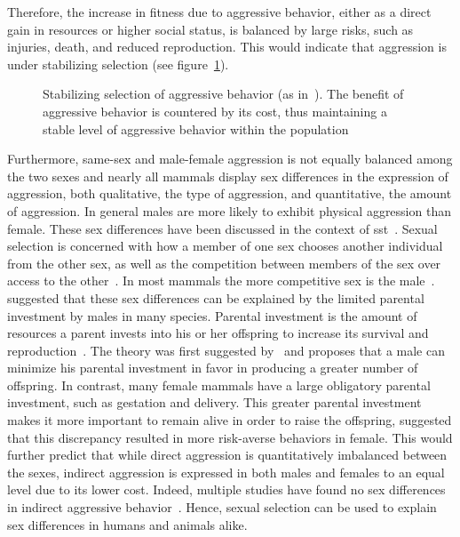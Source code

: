 Therefore, the increase in fitness due to aggressive behavior, either as a direct gain in resources or higher social status, is balanced by large risks, such as injuries, death, and reduced reproduction.
This would indicate that aggression is under stabilizing selection (see figure~\ref{fig:stab}).

\begin{figure}[hp]
	\centering
	\scalebox{0.6}{}
  \caption[Stabilizing Selection of Aggressive Behavior]{Stabilizing selection of aggressive behavior (as in~\citet{Anholt2012}).
  The benefit of aggressive behavior is countered by its cost, thus maintaining a stable level of aggressive behavior within the population}\label{fig:stab}
\end{figure}

Furthermore, same-sex and male-female aggression is not equally balanced among the two sexes and nearly all mammals display sex differences in the expression of aggression, both
qualitative, the type of aggression, and quantitative, the amount of aggression.
In general males are more likely to exhibit physical aggression than female.
These sex differences have been discussed in the context of \acrfull{sst}~\cite{Archer2004,Anderson2002,Archer2009}. 
Sexual selection is concerned with how a member of one sex chooses another individual from the other sex, as well as the competition between members of the sex over access to the other~\cite{Darwin1859}.
In most mammals the more competitive sex is the male~\cite{Archer2009}. 
\citet{Trivers1972} suggested that these sex differences can be explained by the limited parental investment by males in many species.
Parental investment is the amount of resources a parent invests into his or her offspring to increase its survival and reproduction~\cite{Archer2009}.
The theory was first suggested by~\citet{0198504403} and proposes that a male can minimize his parental investment in favor in producing a greater number of offspring.
In contrast, many female mammals have a large obligatory parental investment, such as gestation and delivery.
This greater parental investment makes it more important to remain alive in order to raise the offspring,
\citet{Campbell1999} suggested that this discrepancy resulted in more risk-averse behaviors in female.
This would further predict that while direct aggression is quantitatively imbalanced between the sexes, indirect aggression is expressed in both males and females to an equal level due to its lower cost.
Indeed, multiple studies have found no sex differences in indirect aggressive behavior~\cite{NoelCard2008}.
Hence, sexual selection can be used to explain sex differences in humans and animals alike.

